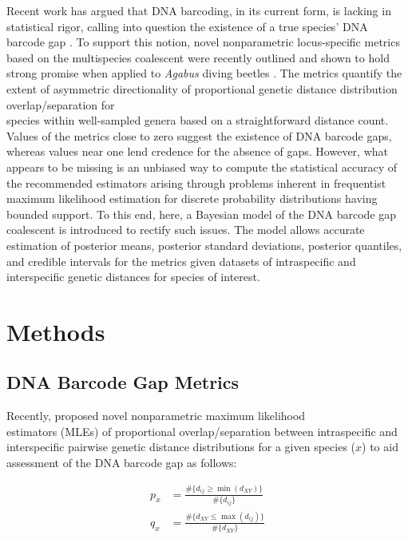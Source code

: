 \documentclass[12pt]{article}
\begin{document}
Recent work has argued that DNA barcoding, in its current form, is lacking in statistical rigor, calling into question the existence of a true species' DNA barcode gap \cite{phillips2022lack}. To support this notion, novel nonparametric locus-specific metrics based on the multispecies coalescent were recently outlined and shown to hold strong promise when applied to \textit{Agabus} diving beetles \cite{phillips2024measure}. The metrics quantify the extent of asymmetric directionality of proportional genetic distance distribution overlap/separation for \\ species within well-sampled genera based on a straightforward distance count. Values of the metrics close to zero suggest the existence of DNA barcode gaps, whereas values near one lend credence for the absence of gaps. However, what appears to be missing is an unbiased way to compute the statistical accuracy of the recommended estimators arising through problems inherent in frequentist maximum likelihood estimation for discrete probability distributions having bounded support. To this end, here, a Bayesian model of the DNA barcode gap coalescent is introduced to rectify such issues. The model allows accurate estimation of posterior means, posterior standard deviations, posterior quantiles, and credible intervals for the metrics given datasets of intraspecific and interspecific genetic distances for species of interest.


\section{Methods}

\subsection{DNA Barcode Gap Metrics}

Recently, \citet{phillips2024measure} proposed novel nonparametric maximum likelihood \\ estimators (MLEs) of proportional overlap/separation between intraspecific and interspecific pairwise genetic distance distributions for a given species ($x$) to aid assessment of the DNA barcode gap as follows:

\begin{align}
p_x &= \frac{\#\{d_{ij} \geq \min(d_{XY})\}}{\#\{d_{ij}\}} \\[1mm]
q_x &= \frac{\#\{d_{XY} \leq \max(d_{ij})\}}{\#\{d_{XY}\}}
\end{align}
\end{document}
